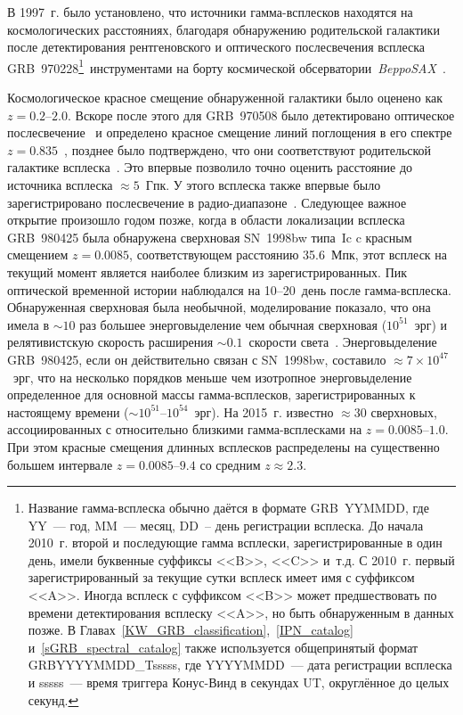 В 1997~г. было установлено, что источники гамма-всплесков находятся на космологических расстояниях, 
благодаря обнаружению родительской галактики после детектирования 
рентгеновского и оптического послесвечения всплеска GRB~970228\footnote{
Название гамма-всплеска обычно даётся в формате GRB~YYMMDD,
где YY~--- год, MM~--- месяц, DD~-- день регистрации всплеска.
До начала 2010~г. второй и последующие гамма всплески, зарегистрированные в один день, имели 
буквенные суффиксы <<B>>, <<C>> и~т.д. С 2010~г. первый зарегистрированный за текущие сутки 
всплеск имеет имя с суффиксом <<A>>. Иногда всплеск с суффиксом <<B>> может предшествовать
по времени детектирования всплеску <<A>>, но быть обнаруженным в данных позже.
В Главах~\ref{KW_GRB_classification},~\ref{IPN_catalog} и~\ref{sGRB_spectral_catalog} 
также используется общепринятый формат GRBYYYYMMDD\_Tsssss, где YYYYMMDD~--- дата 
регистрации всплеска и sssss~--- время триггера Конус-Винд в секундах UT,
округлённое до целых секунд.
}\ инструментами на 
борту космической обсерватории~\textit{BeppoSAX}~\citep{Costa1997Natur, van_Paradijs_1997Natur}.

Космологическое красное смещение обнаруженной галактики было оценено как $z=0.2\mbox{--}2.0$.
Вскоре после этого для GRB~970508 было детектировано оптическое послесвечение~\citep{Djorgovski_1997Natur} 
и определено красное смещение линий поглощения в его спектре 
$z=0.835$~\citep{Metzger_1997Natur, Reichart_1998ApJ}, позднее было подтверждено, 
что они соответствуют родительской галактике всплеска~\citep{Fruchter_2000ApJ}. 
Это впервые позволило точно оценить расстояние до источника всплеска $\approx 5$~Гпк. 
У этого всплеска также впервые было зарегистрировано послесвечение в радио-диапазоне~\citep{Frail_1997Natur}.
Следующее важное открытие произошло годом позже, когда в области локализации 
всплеска GRB~980425 была обнаружена сверхновая SN~1998bw типа~Ic c красным смещением $z=0.0085$,
соответствующем расстоянию 35.6~Мпк, этот всплеск на текущий момент является наиболее 
близким из зарегистрированных.
Пик оптической временной истории наблюдался на 10--20~день после гамма-всплеска.
Обнаруженная сверхновая была необычной, моделирование показало, что она 
имела в $\sim 10$ раз большее энерговыделение чем обычная 
сверхновая ($10^{51}$~эрг) и релятивистскую скорость расширения 
$\sim 0.1$~скорости света~\citep{Hjorth_and_Bloom_2012in_book}. 
Энерговыделение GRB~980425, если он действительно связан с SN~1998bw, составило 
$\approx 7\times 10^{47}$~эрг, что на несколько порядков меньше чем изотропное энерговыделение 
определенное для основной массы гамма-всплесков, зарегистрированных к настоящему 
времени ($\sim 10^{51}$--$10^{54}$~эрг).
На 2015~г. известно $\approx 30$ сверхновых, ассоциированных с относительно близкими 
гамма-всплесками на $z=0.0085\mbox{--}1.0$.
При этом красные смещения длинных всплесков распределены на существенно большем 
интервале $z=0.0085\mbox{--}9.4$ со средним $z\approx 2.3$.


